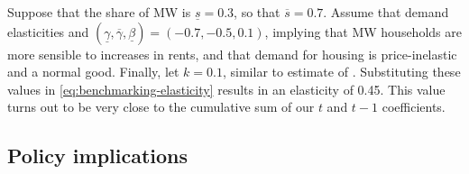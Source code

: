 Suppose that the share of MW is $\underline{s} = 0.3$, so that $\overline{s}=0.7$. Assume that 
demand elasticities and $(\underline{\gamma}, \overline{\gamma}, \underline{\beta}) = (- 0.7, 
- 0.5, 0.1)$, implying that MW households are more sensible to increases in rents, and that 
demand for housing is price-inelastic and a normal good. Finally, let $k = 0.1$, similar to 
estimate of \textcite[][Table 5]{Diamond2016}. Substituting these values in 
\eqref{eq:benchmarking-elasticity} results in an elasticity of 0.45. This value turns out to be 
very close to the cumulative sum of our $t$ and $t-1$ coefficients.


\subsection{Policy implications}\label{sec:policy}

